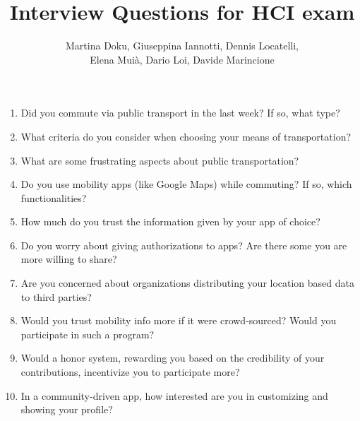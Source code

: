 \documentclass[a4paper, 12pt]{article}
\title{\Huge Interview Questions for HCI exam}
\author{Martina Doku, Giuseppina Iannotti, Dennis Locatelli,\\Elena Muià, Dario Loi, Davide Marincione}
\begin{document}
    \maketitle
    \begin{enumerate}
        \item Did you commute via public transport in the last week? If so, what type?
        \item What criteria do you consider when choosing your means of transportation?
        \item What are some frustrating aspects about public transportation?
        \item Do you use mobility apps (like Google Maps) while commuting? If so, which functionalities? 
        \item How much do you trust the information given by your app of choice?
        \item Do you worry about giving authorizations to apps? Are there some you are more willing to share?
        \item Are you concerned about organizations distributing your location based data to third parties?
        \item Would you trust mobility info more if it were crowd-sourced? Would you participate in such a program?
        \item Would a honor system, rewarding you based on the credibility of your contributions, incentivize you to participate more?
        \item In a community-driven app, how interested are you in customizing and showing your profile?
    \end{enumerate}
\end{document}
